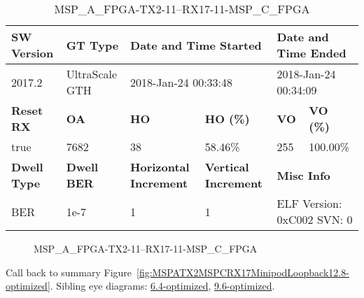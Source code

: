 \begin{table}[h]
\centering
\caption{MSP\_A\_FPGA-TX2-11--RX17-11-MSP\_C\_FPGA}
\label{tab:MSPAFPGATX211RX1711MSPCFPGA12.8-optimized}
\begin{tabular}{@{}|l|l|l|l|l|l|@{}}
\toprule
\textbf{SW Version}                & \textbf{GT Type}   & \multicolumn{2}{l|}{\textbf{Date and Time Started}}            & \multicolumn{2}{l|}{\textbf{Date and Time Ended}}        \\ \midrule
2017.2                       & UltraScale GTH          & \multicolumn{2}{l|}{2018-Jan-24 00:33:48}                   & \multicolumn{2}{l|}{2018-Jan-24 00:34:09}               \\ \midrule
\textbf{Reset RX}                  & \textbf{OA} & \textbf{HO}   & \textbf{HO (\%)} & \textbf{VO} & \textbf{VO (\%)} \\ \midrule
true & 7682        & 38          & 58.46\%        & 255        & 100.00\%       \\ \midrule
\textbf{Dwell Type}                & \textbf{Dwell BER} & \textbf{Horizontal Increment} & \textbf{Vertical Increment}    & \multicolumn{2}{l|}{\textbf{Misc Info}}                  \\ \midrule
BER                            & 1e-7        & 1        & 1           & \multicolumn{2}{l|}{ELF Version: 0xC002 SVN: 0}                         \\ \bottomrule
\end{tabular}
\end{table}

\begin{figure}[h]
\caption{MSP\_A\_FPGA-TX2-11--RX17-11-MSP\_C\_FPGA} \label{fig:MSPAFPGATX211RX1711MSPCFPGA12.8-optimized}
\end{figure}

Call back to summary Figure~\ref{fig:MSPATX2MSPCRX17MinipodLoopback12.8-optimized}.
Sibling eye diagrams: \hyperref[sec:MSPAFPGATX211RX1711MSPCFPGA6.4-optimized]{6.4-optimized}, \hyperref[sec:MSPAFPGATX211RX1711MSPCFPGA9.6-optimized]{9.6-optimized}.

\clearpage
\newpage

